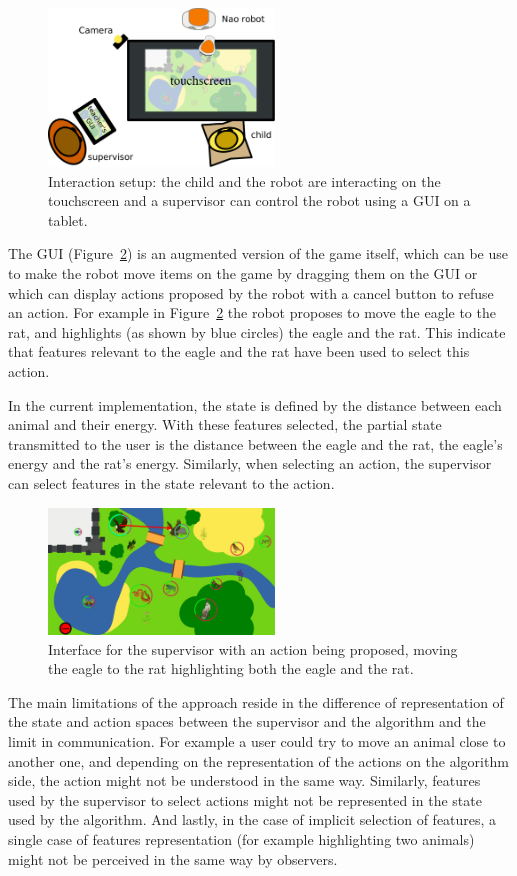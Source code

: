 \documentclass[letterpaper]{article} %
\begin{document}
\begin{figure}
        \centering
  \includegraphics[width=60mm]{./figs/setup} 
    \caption{Interaction setup: the child and the robot are interacting on the
    touchscreen and a supervisor can control the robot using a GUI on a tablet.}
        \label{fig:setup}
\end{figure}


The GUI (Figure~\ref{fig:gui}) is an augmented version of the game itself, which
can be use to make the robot move items on the game by dragging them on the GUI
or which can display actions proposed by the robot with a cancel button to
refuse an action. For example in Figure~\ref{fig:gui} the robot proposes to move
the eagle to the rat, and highlights (as shown by blue circles) the eagle and the
rat. This indicate that features relevant to the eagle and the rat have been
used to select this action.

In the current implementation, the state is defined by the distance between each
animal and their energy. With these features selected, the partial state
transmitted to the user is the distance between the eagle and the rat, the
eagle's energy and
the rat's energy. Similarly, when selecting an action, the supervisor can 
select features in the state relevant to the action.

\begin{figure}
        \centering
    \includegraphics[width=60mm]{./figs/proposition.png}
    \caption{Interface for the supervisor with an action being proposed, moving
        the eagle to the rat highlighting both the eagle and the rat.}
        \label{fig:gui}
\end{figure}


The main limitations of the approach reside in the difference of
representation of the state and action spaces between the supervisor and the
algorithm and the limit in communication. For example a user could try to move
an animal close to another one,
and depending on the representation of the actions on the algorithm side, the
action might not be understood in the same way. Similarly, features used by the
supervisor to select actions might not be represented in the state used by the
algorithm. And lastly, in the case of implicit selection of features, a single
case of features representation (for example highlighting two animals) might not
be perceived in the same way by observers.
\end{document}
